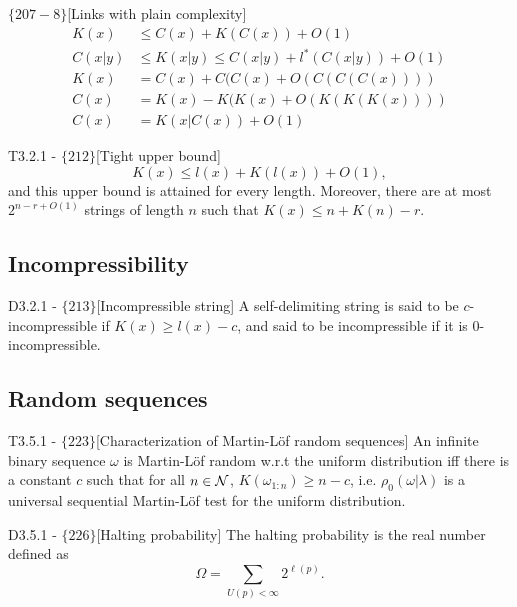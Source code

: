 \documentclass{article}
\begin{document}
\begin{flexidefinition}{$\{207-8\}$}[Links with plain complexity]
	\begin{align}
		K(x) & \leq C(x) + K(C(x)) + O(1)\\
		C(x|y) &\leq K(x|y) \leq C(x|y) + l^\ast(C(x|y)) + O(1)\\
		K(x) &= C(x) + C(C(x) + O(C(C(C(x))))\\
		C(x) &= K(x) - K(K(x) + O(K(K(K(x))))\\
		C(x) &= K(x|C(x)) + O(1)
	\end{align}
\end{flexidefinition}

\begin{flexitheorem}{T3.2.1 - $\{212\}$}[Tight upper bound]
	\begin{equation}
		K(x) \leq l(x) + K(l(x)) + O(1),
	\end{equation}
	and this upper bound is attained for every length. Moreover, there are at most $2^{n-r+O(1)}$ strings of length $n$ such that $K(x) \leq n + K(n) - r$.
\end{flexitheorem}

\subsection{Incompressibility}

\begin{flexidefinition}{D3.2.1 - $\{213\}$}[Incompressible string]
	A self-delimiting string is said to be $c$-incompressible if $K(x) \geq l(x) - c$, and said to be incompressible if it is $0$-incompressible.
\end{flexidefinition}

\subsection{Random sequences}

\begin{flexitheorem}{T3.5.1 - $\{223\}$}[Characterization of Martin-Löf random sequences]
    An infinite binary sequence $\omega$ is Martin-Löf random w.r.t the uniform distribution iff there is a constant $c$ such that for all $n \in \mathcal{N}$, $K(\omega_{1:n}) \geq n - c$, i.e. $\rho_0(\omega|\lambda)$ is a universal sequential Martin-Löf test for the uniform distribution.
\end{flexitheorem}

\begin{flexidefinition}{D3.5.1 - $\{226\}$}[Halting probability]
    The halting probability is the real number defined as 
    \begin{equation}
        \Omega = \sum_{U(p) < \infty} 2^{\ell(p)}.
    \end{equation}
\end{flexidefinition}
\end{document}
